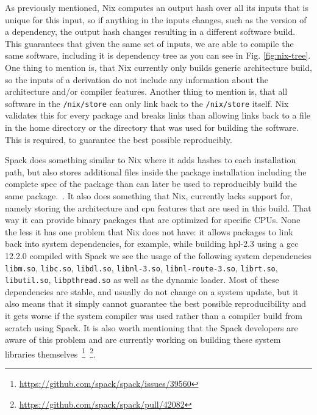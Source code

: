 \documentclass{eceasst}
\begin{document}
As previously mentioned, Nix computes an output hash over all its inputs that is unique for this input, so if anything in the inputs changes, such as the version of a dependency, the output hash changes resulting in a different software build.
This guarantees that given the same set of inputs, we are able to compile the same software, including it is dependency tree as you can see in Fig. \ref{fig:nix-tree}.
One thing to mention is, that Nix currently only builds generic architecture build, so the inputs of a derivation do not include any information about the architecture and/or compiler features.
Another thing to mention is, that all software in the \texttt{/nix/store} can only link back to the \texttt{/nix/store} itself.
Nix validates this for every package and breaks links than allowing links back to a file in the home directory or the directory that was used for building the software.
This is required, to guarantee the best possible reproducibly.

Spack does something similar to Nix where it adds hashes to each installation path, but also stores additional files inside the package installation including the complete spec of the package than can later be used to reproducibly build the same package.~\cite{Gamblin_2015}.
It also does something that Nix, currently lacks support for, namely storing the architecture and cpu features that are used in this build.
That way it can provide binary packages that are optimized for specific CPUs.
None the less it has one problem that Nix does not have: it allows packages to link back into system dependencies, for example, while building hpl-2.3 using a gcc 12.2.0 compiled with Spack we see the usage of the following system dependencies \texttt{libm.so}, \texttt{libc.so}, \texttt{libdl.so}, \texttt{libnl-3.so}, \texttt{libnl-route-3.so}, \texttt{librt.so}, \texttt{libutil.so}, \texttt{libpthread.so} as well as the dynamic loader.
Most of these dependencies are stable, and usually do not change on a system update, but it also means that it simply cannot guarantee the best possible reproducibility and it gets worse if the system compiler was used rather than a compiler build from scratch using Spack.
It is also worth mentioning that the Spack developers are aware of this problem and are currently working on building these system libraries themselves~\footnote{\url{https://github.com/spack/spack/issues/39560}}~\footnote{\url{https://github.com/spack/spack/pull/42082}}.
\end{document}
